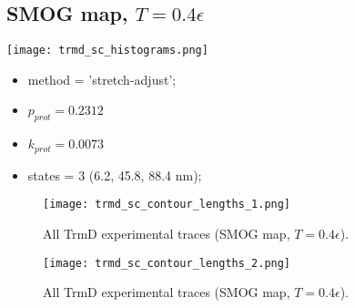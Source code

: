 \subsection{SMOG map, $T=0.4\epsilon$}
\label{subsec:trmd-sc}
\begin{minipage}[c]{0.7\textwidth}
    \texttt{[image: trmd\_sc\_histograms.png]}
\end{minipage}
\hfill
\begin{minipage}[c]{0.45\textwidth}
    \begin{itemize}
        \item method = 'stretch-adjust';
        \item $p_{prot}=0.2312$
        \item $k_{prot}=0.0073$
        \item states = 3 (6.2, 45.8, 88.4 nm);
    \end{itemize}
\end{minipage}

\begin{figure}
    \centering
    \texttt{[image: trmd\_sc\_contour\_lengths\_1.png]}
    \caption{All TrmD experimental traces (SMOG map, $T=0.4\epsilon$).}
    \label{fig:trmd-sc-cl1}
\end{figure}

\begin{figure}
    \centering
    \texttt{[image: trmd\_sc\_contour\_lengths\_2.png]}
    \caption{All TrmD experimental traces (SMOG map, $T=0.4\epsilon$).}
    \label{fig:trmd-sc-cl2}
\end{figure}

